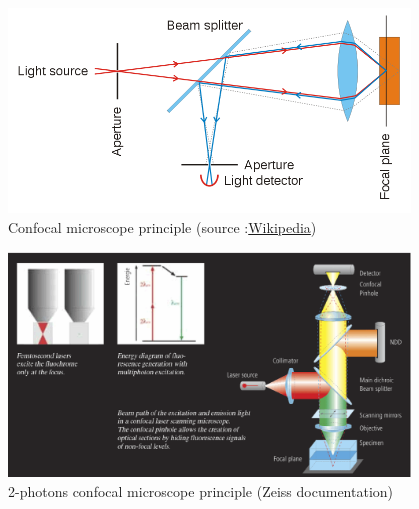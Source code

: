 \begin{figure}[htb]
\begin{center}
\leavevmode
\includegraphics[width=0.95\textwidth]{pictures/ConfocalPrinciple}
\end{center}
\caption{Confocal microscope principle (source :\href{http://en.wikipedia.org/wiki/File:Confocalprinciple.svg}{Wikipedia})}
\label{fig:ConfocalPrinciple}
\end{figure}

\begin{figure}[htb]
\begin{center}
\leavevmode
\includegraphics[width=0.95\textwidth]{pictures/ConfocalZeissPrinciple}
\end{center}
\caption{2-photons confocal microscope principle (Zeiss documentation)}
\label{fig:Confocal2photonsPrinciple}
\end{figure}

